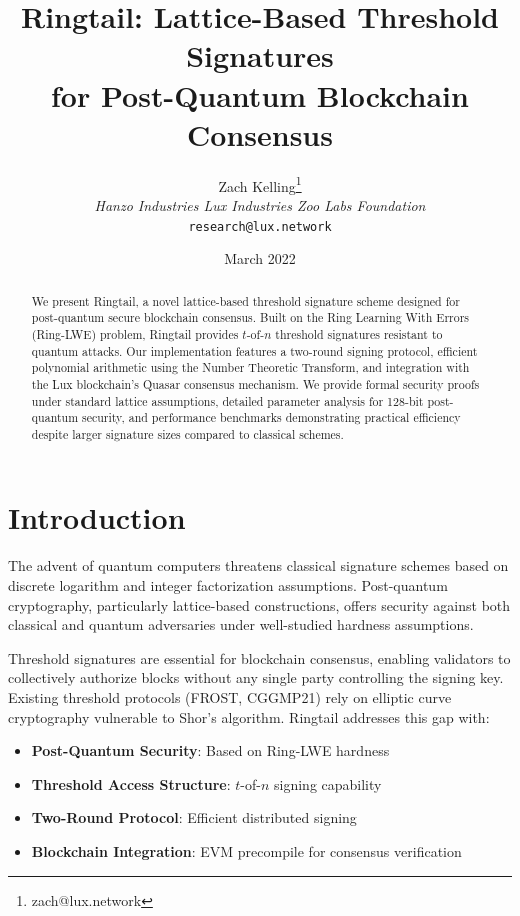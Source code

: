 \documentclass[11pt,a4paper]{article}
\title{\textbf{Ringtail: Lattice-Based Threshold Signatures \\for Post-Quantum Blockchain Consensus}}
\author{Zach Kelling\thanks{zach@lux.network} \\ \textit{Hanzo Industries \quad Lux Industries \quad Zoo Labs Foundation} \\ \texttt{research@lux.network}}
\date{March 2022}
\theoremstyle{definition}
\begin{document}
\maketitle

\begin{abstract}
We present Ringtail, a novel lattice-based threshold signature scheme designed for post-quantum secure blockchain consensus. Built on the Ring Learning With Errors (Ring-LWE) problem, Ringtail provides $t$-of-$n$ threshold signatures resistant to quantum attacks. Our implementation features a two-round signing protocol, efficient polynomial arithmetic using the Number Theoretic Transform, and integration with the Lux blockchain's Quasar consensus mechanism. We provide formal security proofs under standard lattice assumptions, detailed parameter analysis for 128-bit post-quantum security, and performance benchmarks demonstrating practical efficiency despite larger signature sizes compared to classical schemes.
\end{abstract}

\section{Introduction}

The advent of quantum computers threatens classical signature schemes based on discrete logarithm and integer factorization assumptions. Post-quantum cryptography, particularly lattice-based constructions, offers security against both classical and quantum adversaries under well-studied hardness assumptions.

Threshold signatures are essential for blockchain consensus, enabling validators to collectively authorize blocks without any single party controlling the signing key. Existing threshold protocols (FROST, CGGMP21) rely on elliptic curve cryptography vulnerable to Shor's algorithm. Ringtail addresses this gap with:

\begin{itemize}
\item \textbf{Post-Quantum Security}: Based on Ring-LWE hardness
\item \textbf{Threshold Access Structure}: $t$-of-$n$ signing capability
\item \textbf{Two-Round Protocol}: Efficient distributed signing
\item \textbf{Blockchain Integration}: EVM precompile for consensus verification
\end{itemize}
\end{document}
